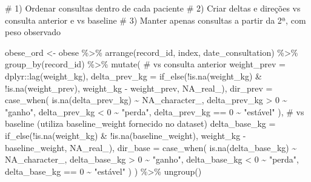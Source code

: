 \documentclass[
]{article}
\newenvironment{Shaded}{\begin{snugshade}}{\end{snugshade}}
\newcommand{\AttributeTok}[1]{\textcolor[rgb]{0.40,0.45,0.13}{#1}}
\newcommand{\CommentTok}[1]{\textcolor[rgb]{0.37,0.37,0.37}{#1}}
\newcommand{\ConstantTok}[1]{\textcolor[rgb]{0.56,0.35,0.01}{#1}}
\newcommand{\DecValTok}[1]{\textcolor[rgb]{0.68,0.00,0.00}{#1}}
\newcommand{\FunctionTok}[1]{\textcolor[rgb]{0.28,0.35,0.67}{#1}}
\newcommand{\NormalTok}[1]{\textcolor[rgb]{0.00,0.23,0.31}{#1}}
\newcommand{\OtherTok}[1]{\textcolor[rgb]{0.00,0.23,0.31}{#1}}
\newcommand{\SpecialCharTok}[1]{\textcolor[rgb]{0.37,0.37,0.37}{#1}}
\newcommand{\StringTok}[1]{\textcolor[rgb]{0.13,0.47,0.30}{#1}}
\begin{document}
\begin{Shaded}
\begin{Highlighting}[]
\CommentTok{\# 1) Ordenar consultas dentro de cada paciente}
\CommentTok{\# 2) Criar deltas e direções vs consulta anterior e vs baseline}
\CommentTok{\# 3) Manter apenas consultas a partir da 2ª, com peso observado}

\NormalTok{obese\_ord }\OtherTok{\textless{}{-}}\NormalTok{ obese }\SpecialCharTok{\%\textgreater{}\%}
  \FunctionTok{arrange}\NormalTok{(record\_id, index, date\_consultation) }\SpecialCharTok{\%\textgreater{}\%}
  \FunctionTok{group\_by}\NormalTok{(record\_id) }\SpecialCharTok{\%\textgreater{}\%}
  \FunctionTok{mutate}\NormalTok{(}
    \CommentTok{\# vs consulta anterior}
    \AttributeTok{weight\_prev   =}\NormalTok{ dplyr}\SpecialCharTok{::}\FunctionTok{lag}\NormalTok{(weight\_kg),}
    \AttributeTok{delta\_prev\_kg =} \FunctionTok{if\_else}\NormalTok{(}\SpecialCharTok{!}\FunctionTok{is.na}\NormalTok{(weight\_kg) }\SpecialCharTok{\&} \SpecialCharTok{!}\FunctionTok{is.na}\NormalTok{(weight\_prev),}
\NormalTok{                            weight\_kg }\SpecialCharTok{{-}}\NormalTok{ weight\_prev, }\ConstantTok{NA\_real\_}\NormalTok{),}
    \AttributeTok{dir\_prev =} \FunctionTok{case\_when}\NormalTok{(}
      \FunctionTok{is.na}\NormalTok{(delta\_prev\_kg)         }\SpecialCharTok{\textasciitilde{}} \ConstantTok{NA\_character\_}\NormalTok{,}
\NormalTok{      delta\_prev\_kg }\SpecialCharTok{\textgreater{}} \DecValTok{0}            \SpecialCharTok{\textasciitilde{}} \StringTok{"ganho"}\NormalTok{,}
\NormalTok{      delta\_prev\_kg }\SpecialCharTok{\textless{}} \DecValTok{0}            \SpecialCharTok{\textasciitilde{}} \StringTok{"perda"}\NormalTok{,}
\NormalTok{      delta\_prev\_kg }\SpecialCharTok{==} \DecValTok{0}           \SpecialCharTok{\textasciitilde{}} \StringTok{"estável"}
\NormalTok{    ),}
    \CommentTok{\# vs baseline (utiliza baseline\_weight fornecido no dataset)}
    \AttributeTok{delta\_base\_kg =} \FunctionTok{if\_else}\NormalTok{(}\SpecialCharTok{!}\FunctionTok{is.na}\NormalTok{(weight\_kg) }\SpecialCharTok{\&} \SpecialCharTok{!}\FunctionTok{is.na}\NormalTok{(baseline\_weight),}
\NormalTok{                            weight\_kg }\SpecialCharTok{{-}}\NormalTok{ baseline\_weight, }\ConstantTok{NA\_real\_}\NormalTok{),}
    \AttributeTok{dir\_base =} \FunctionTok{case\_when}\NormalTok{(}
      \FunctionTok{is.na}\NormalTok{(delta\_base\_kg)         }\SpecialCharTok{\textasciitilde{}} \ConstantTok{NA\_character\_}\NormalTok{,}
\NormalTok{      delta\_base\_kg }\SpecialCharTok{\textgreater{}} \DecValTok{0}            \SpecialCharTok{\textasciitilde{}} \StringTok{"ganho"}\NormalTok{,}
\NormalTok{      delta\_base\_kg }\SpecialCharTok{\textless{}} \DecValTok{0}            \SpecialCharTok{\textasciitilde{}} \StringTok{"perda"}\NormalTok{,}
\NormalTok{      delta\_base\_kg }\SpecialCharTok{==} \DecValTok{0}           \SpecialCharTok{\textasciitilde{}} \StringTok{"estável"}
\NormalTok{    )}
\NormalTok{  ) }\SpecialCharTok{\%\textgreater{}\%}
  \FunctionTok{ungroup}\NormalTok{()}


\end{Highlighting}
\end{Shaded}
\end{document}
